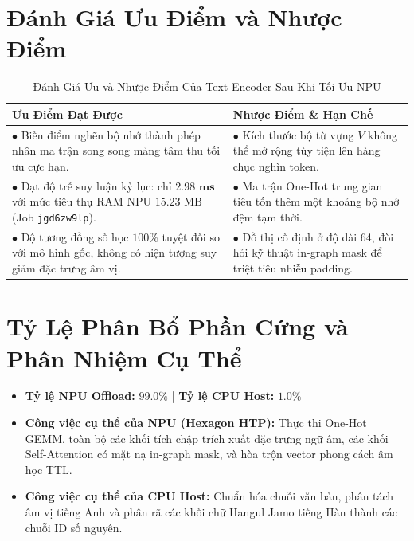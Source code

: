 \documentclass[11pt,a4paper,oneside,table]{report}
\begin{document}
\section{Đánh Giá Ưu Điểm và Nhược Điểm}
\begin{table}[H]
\centering
\small
\sffamily
\caption{Đánh Giá Ưu và Nhược Điểm Của Text Encoder Sau Khi Tối Ưu NPU}
\label{tab:te_pros_cons}
\vspace{2mm}
\begin{tabularx}{\textwidth}{p{7.5cm} p{7.5cm}}
\toprule
\textbf{Ưu Điểm Đạt Được} & \textbf{Nhược Điểm \& Hạn Chế} \\
\midrule
$\bullet$ Biến điểm nghẽn bộ nhớ thành phép nhân ma trận song song mảng tâm thu tối ưu cực hạn. & $\bullet$ Kích thước bộ từ vựng $V$ không thể mở rộng tùy tiện lên hàng chục nghìn token. \\
\addlinespace
$\bullet$ Đạt độ trễ suy luận kỷ lục: chỉ $\mathbf{2.98\text{ ms}}$ với mức tiêu thụ RAM NPU $15.23\text{ MB}$ (Job \texttt{jgd6zw9lp}). & $\bullet$ Ma trận One-Hot trung gian tiêu tốn thêm một khoảng bộ nhớ đệm tạm thời. \\
\addlinespace
$\bullet$ Độ tương đồng số học $100\%$ tuyệt đối so với mô hình gốc, không có hiện tượng suy giảm đặc trưng âm vị. & $\bullet$ Đồ thị cố định ở độ dài 64, đòi hỏi kỹ thuật in-graph mask để triệt tiêu nhiễu padding. \\
\bottomrule
\end{tabularx}
\end{table}

\section{Tỷ Lệ Phân Bổ Phần Cứng và Phân Nhiệm Cụ Thể}
\begin{itemize}
    \item \textbf{Tỷ lệ NPU Offload:} $\mathbf{99.0\%}$ | \textbf{Tỷ lệ CPU Host:} $\mathbf{1.0\%}$
    \item \textbf{Công việc cụ thể của NPU (Hexagon HTP):} Thực thi One-Hot GEMM, toàn bộ các khối tích chập trích xuất đặc trưng ngữ âm, các khối Self-Attention có mặt nạ in-graph mask, và hòa trộn vector phong cách âm học TTL.
    \item \textbf{Công việc cụ thể của CPU Host:} Chuẩn hóa chuỗi văn bản, phân tách âm vị tiếng Anh và phân rã các khối chữ Hangul Jamo tiếng Hàn thành các chuỗi ID số nguyên.
\end{itemize}

\end{document}
